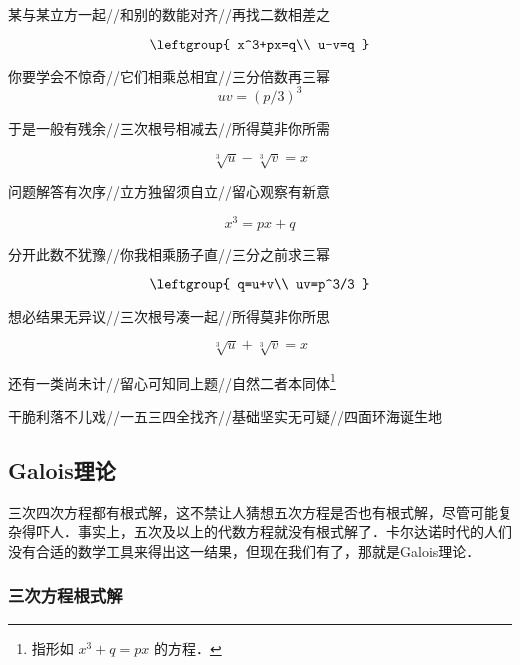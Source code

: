 某与某立方一起//和别的数能对齐//再找二数相差之

\begin{equation}
\leftgroup{
    x^3+px=q\\
    u-v=q
}
\end{equation}

你要学会不惊奇//它们相乘总相宜//三分倍数再三幂
\begin{equation}
uv=(p/3)^3
\end{equation}

于是一般有残余//三次根号相减去//所得莫非你所需

\begin{equation}
\sqrt[3]{u}-\sqrt[3]{v}=x
\end{equation}


问题解答有次序//立方独留须自立//留心观察有新意

\begin{equation}
x^3=px+q
\end{equation}

分开此数不犹豫//你我相乘肠子直//三分之前求三幂

\begin{equation}
\leftgroup{
    q=u+v\\
    uv=p^3/3
}
\end{equation}

想必结果无异议//三次根号凑一起//所得莫非你所思

\begin{equation}
\sqrt[3]{u}+\sqrt[3]{v}=x
\end{equation}


还有一类尚未计//留心可知同上题//自然二者本同体\footnote{指形如
$
x^3+q=px
$
的方程．}


干脆利落不儿戏//一五三四全找齐//基础坚实无可疑//四面环海诞生地






\subsection{Galois理论}\label{PlyRtS_sub1}

三次四次方程都有根式解，这不禁让人猜想五次方程是否也有根式解，尽管可能复杂得吓人．事实上，五次及以上的代数方程就没有根式解了．卡尔达诺时代的人们没有合适的数学工具来得出这一结果，但现在我们有了，那就是Galois理论．








\subsubsection{三次方程根式解}


